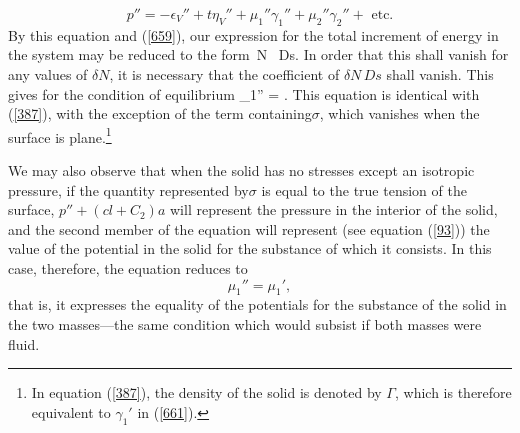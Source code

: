 \documentclass[12pt]{article}
\newcommand{\dd}{\delta}
\begin{document}
$$ p''= - \epsilon_V'' + t\eta_V'' + \mu_1''\gamma_1'' + \mu_2''\gamma_2'' + \text{ etc.} $$
By this equation and (\ref{659}), our expression for the total increment of energy in the system may be reduced to the form
\eqs \int{} \,\dd N \, Ds.  \label{660}\eqe
In order that this shall vanish for any values of $\dd N$, it is necessary that the coefficient of $\dd N \, Ds$ shall vanish. This gives for the condition of equilibrium
\eqs \mu_1'' =   . \label{661}\eqe
This equation is identical with (\ref{387}), with the exception of the term containing$\sigma$, which vanishes when the surface is plane.\footnote{In equation (\ref{387}), the density of the solid is denoted by $\Gamma$, which is therefore equivalent to $\gamma_1'$ in (\ref{661}).}

We may also observe that when the solid has no stresses except an isotropic pressure, if the quantity represented by$\sigma$ is equal to the true tension of the surface, $p''+(cl+C_2)a$ will represent the pressure in the interior of the solid, and the second member of the equation will represent (see equation (\ref{93})) the value of the potential in the solid for the substance of which it consists. In this case, therefore, the
equation reduces to
$$\mu_1''=\mu_1',$$
that is, it expresses the equality of the potentials for the substance of the solid in the two masses---the same condition which would subsist if both masses were fluid.
\end{document}

